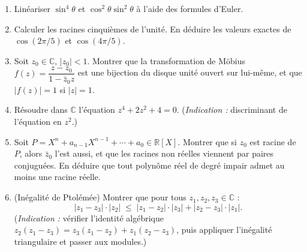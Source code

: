 \exolabel

\begin{mdframed}[style=exobar]
  \begin{enumerate}
    \item Linéariser $\sin^4\theta$ et $\cos^2\theta\sin^2\theta$ à l'aide des
          formules d'Euler.

    \item Calculer les racines cinquièmes de l'unité. En déduire les valeurs
          exactes de $\cos(2\pi/5)$ et $\cos(4\pi/5)$.

    \item Soit $z_0 \in \mathbb{C}$, $|z_0| < 1$. Montrer que la transformation
          de Möbius
          $f(z) = \dfrac{z - z_0}{1 - \bar{z}_0 z}$
          est une bijection du disque unité ouvert sur lui-même, et que $|f(z)| = 1$
          si $|z| = 1$.

    \item Résoudre dans $\mathbb{C}$ l'équation $z^4 + 2z^2 + 4 = 0$.
          (\textit{Indication :} discriminant de l'équation en $z^2$.)

    \item Soit $P = X^n + a_{n-1}X^{n-1} + \cdots + a_0 \in \mathbb{R}[X]$.
          Montrer que si $z_0$ est racine de $P$, alors $\bar{z}_0$ l'est aussi,
          et que les racines non réelles viennent par paires conjuguées.
          En déduire que tout polynôme réel de degré impair admet au moins une
          racine réelle.

    \item (Inégalité de Ptolémée) Montrer que pour tous $z_1, z_2, z_3 \in \mathbb{C}$ :
          \[
            |z_1 - z_3| \cdot |z_2| \;\leq\;
            |z_1 - z_2| \cdot |z_3| + |z_2 - z_3| \cdot |z_1|.
          \]
          (\textit{Indication :} vérifier l'identité algébrique
          $z_2(z_1 - z_3) = z_3(z_1 - z_2) + z_1(z_2 - z_3)$, puis appliquer
          l'inégalité triangulaire et passer aux modules.)
  \end{enumerate}
\end{mdframed}

